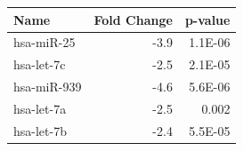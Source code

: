 \begin{center}
    \begin{tabular}{l|r|r}
        \hline
        Name        & Fold Change & p-value \\
        \hline
        hsa-miR-25  & -3.9        & 1.1E-06 \\
        hsa-let-7c  & -2.5        & 2.1E-05 \\
        hsa-miR-939 & -4.6        & 5.6E-06 \\
        hsa-let-7a  & -2.5        & 0.002   \\
        hsa-let-7b  & -2.4        & 5.5E-05 \\
        \hline
    \end{tabular}
    \label{tab:table1}
\end{center}
